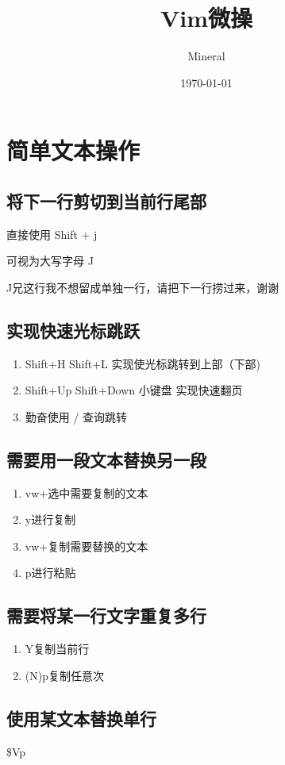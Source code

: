 \documentclass[utf8]{ctexart}
\author{Mineral}
\title{Vim微操}
\date {\today}
\begin{document}
		\maketitle
		\section{简单文本操作}
		\subsection{将下一行剪切到当前行尾部}
		\par 直接使用 Shift + j
		\par 可视为大写字母 J
		\par J兄这行我不想留成单独一行，请把下一行捞过来，谢谢		
		\subsection{实现快速光标跳跃}
		\begin{enumerate}
				\item Shift+H Shift+L 实现使光标跳转到上部（下部)
				\item Shift+Up Shift+Down 小键盘 实现快速翻页
				\item 勤奋使用 / 查询跳转	
		\end{enumerate}
		\subsection{需要用一段文本替换另一段}
		\begin{enumerate}
				\item vw+选中需要复制的文本
				\item y进行复制
				\item vw+复制需要替换的文本
				\item p进行粘贴			
		\end{enumerate}
		\subsection{需要将某一行文字重复多行}
		\begin{enumerate}
				\item Y复制当前行
				\item (N)p复制任意次
		\end{enumerate}
		\subsection{使用某文本替换单行}
		\par \Large \$Vp
\end{document}
